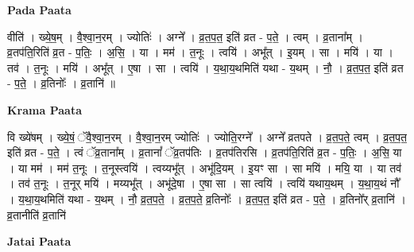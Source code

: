 \documentclass[17pt]{extarticle}
\begin{document}
\textbf{Pada Paata} \newline

वीति॑ । ख्ये॒ष॒म् । वै॒श्वा॒न॒रम् । ज्योतिः॑ । अग्ने᳚ । व्र॒त॒प॒त॒ इति॑ व्रत - प॒ते॒ । त्वम् । व्र॒ताना᳚म् । व्र॒तप॑ति॒रिति॑ व्र॒त - प॒तिः॒ । अ॒सि॒ । या । मम॑ । त॒नूः । त्वयि॑ । अभू᳚त् । इ॒यम् । सा । मयि॑ । या । तव॑ । त॒नूः । मयि॑ । अभू᳚त् । ए॒षा । सा । त्वयि॑ । य॒था॒य॒थमिति॑ यथा - य॒थम् । नौ॒ । व्र॒त॒प॒त॒ इति॑ व्रत - प॒ते॒ । व्र॒तिनोः᳚ । व्र॒तानि॑ ॥  \newline


\textbf{Krama Paata} \newline

वि ख्ये॑षम् । ख्ये॒षं॒ ॅवै॒श्वा॒न॒रम् । वै॒श्वा॒न॒रम् ज्योतिः॑ । ज्योति॒रग्ने᳚ । अग्ने᳚ व्रतपते । व्र॒त॒प॒ते॒ त्वम् । व्र॒त॒प॒त॒ इति॑ व्रत - प॒ते॒ । त्वं ॅव्र॒ताना᳚म् । व्र॒तानां᳚ ॅव्र॒तप॑तिः । व्र॒तप॑तिरसि । व्र॒तप॑ति॒रिति॑ व्र॒त - प॒तिः॒ । अ॒सि॒ या । या मम॑ । मम॑ त॒नूः । त॒नूस्त्वयि॑ । त्वय्यभू᳚त् । अभू॑दि॒यम् । इ॒यꣳ सा । सा मयि॑ । मयि॒ या । या तव॑ । तव॑ त॒नूः । त॒नूर् मयि॑ । मय्यभू᳚त् । अभू॑दे॒षा । ए॒षा सा । सा त्वयि॑ । त्वयि॑ यथाय॒थम् । य॒था॒य॒थं नौ᳚ । य॒था॒य॒थमिति॑ यथा - य॒थम् । नौ॒ व्र॒त॒प॒ते॒ । व्र॒त॒प॒ते॒ व्र॒तिनोः᳚ । व्र॒त॒प॒त॒ इति॑ व्रत - प॒ते॒ । व्र॒तिनो᳚र् व्र॒तानि॑ । व्र॒तानीति॑ व्र॒तानि॑ \newline

\textbf{Jatai Paata} \newline
\end{document}
